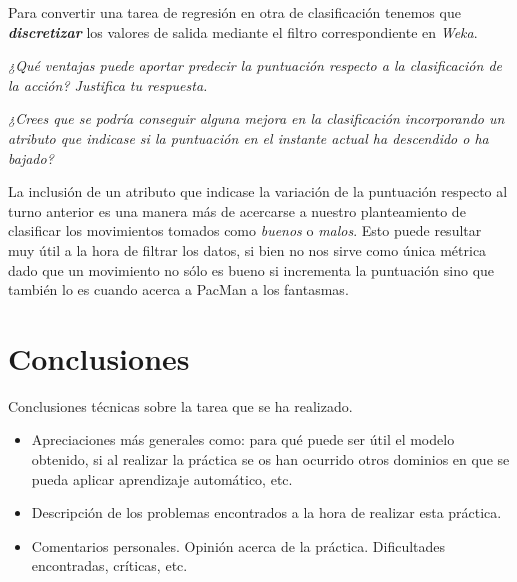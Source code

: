 \documentclass[12pt]{article}
\begin{document}
Para convertir una tarea de regresión en otra de clasificación tenemos que \textbf{\emph{discretizar}} los valores de salida mediante el filtro correspondiente en \emph{Weka}.

\begin{center}
    \vspace{0.5cm} \emph{¿Qué ventajas puede aportar predecir la puntuación respecto a la clasificación de la acción? Justifica tu respuesta.}
    \vspace{0.5cm}
\end{center}


\begin{center}
    \vspace{0.5cm} \emph{¿Crees que se podría conseguir alguna mejora en la clasificación incorporando un atributo que indicase si la puntuación en el instante actual ha descendido o ha bajado?}
    \vspace{0.5cm}
\end{center}

La inclusión de un atributo que indicase la variación de la puntuación respecto al turno anterior es una manera más de acercarse a nuestro planteamiento de clasificar los movimientos tomados como \emph{buenos} o \emph{malos}. Esto puede resultar muy útil a la hora de filtrar los datos, si bien no nos sirve como única métrica dado que un movimiento no sólo es bueno si incrementa la puntuación sino que también lo es cuando acerca a PacMan a los fantasmas.

\section{Conclusiones}

Conclusiones técnicas sobre la tarea que se ha realizado.
\begin{itemize}
  \item Apreciaciones más generales como: para qué puede ser útil el modelo obtenido, si al realizar la práctica se os han ocurrido otros dominios en que se pueda aplicar aprendizaje automático, etc.
  \item Descripción de los problemas encontrados a la hora de realizar esta práctica.
  \item Comentarios personales. Opinión acerca de la práctica. Dificultades encontradas, críticas, etc.
\end{itemize}
\end{document}
